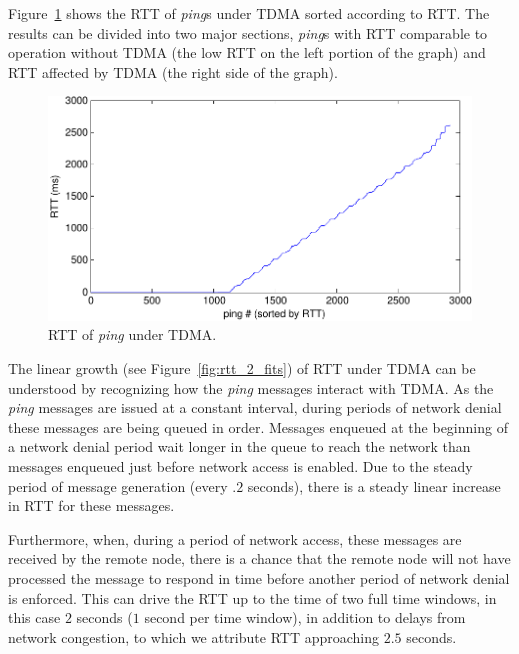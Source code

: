 \documentclass[oneside,12pt]{memoir}
\begin{document}
Figure~\ref{fig:rtt_enabled} shows the RTT of \textit{ping}s under TDMA sorted according to RTT. The results can be divided into two major sections, \textit{ping}s with RTT comparable to operation without TDMA (the low RTT on the left portion of the graph) and RTT affected by TDMA (the right side of the graph). 

\begin{figure}
\centering
\includegraphics[scale=0.85]{rtt_enabled.pdf}
\caption{RTT of \textit{ping} under TDMA.}
\label{fig:rtt_enabled}
\end{figure}

The linear growth (see Figure~\ref{fig:rtt_2_fits}) of RTT under TDMA can be understood by recognizing how the \textit{ping} messages interact with TDMA. As the \textit{ping} messages are issued at a constant interval, during periods of network denial these messages are being queued in order. Messages enqueued at the beginning of a network denial period wait longer in the queue to reach the network than messages enqueued just before network access is enabled. Due to the steady period of message generation (every $.2$ seconds), there is a steady linear increase in RTT for these messages. 

Furthermore, when, during a period of network access, these messages are received by the remote node, there is a chance that the remote node will not have processed the message to respond in time before another period of network denial is enforced. This can drive the RTT up to the time of two full time windows, in this case $2$ seconds ($1$ second per time window), in addition to delays from network congestion, to which we attribute RTT approaching $2.5$ seconds.
\end{document}
